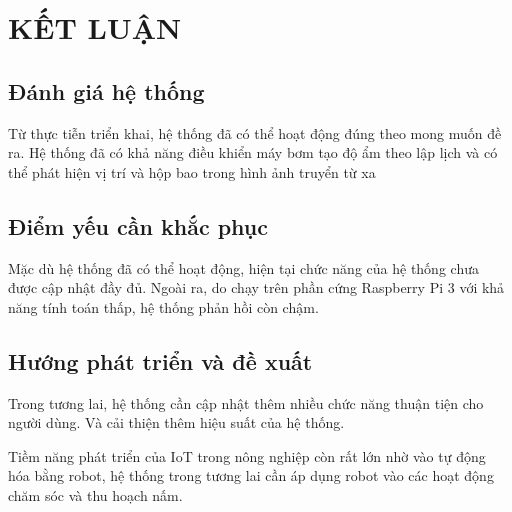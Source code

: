 \chapter{KẾT LUẬN}

\section{Đánh giá hệ thống}

Từ thực tiễn triển khai, hệ thống đã có thể hoạt động đúng theo mong muốn đề ra. Hệ thống đã có khả năng điều khiển máy bơm tạo độ ẩm theo lập lịch và có thể phát hiện vị trí và hộp bao trong hình ảnh truyển từ xa

\section{Điểm yếu cần khắc phục}

Mặc dù hệ thống đã có thể hoạt động, hiện tại chức năng của hệ thống chưa được cập nhật đầy đủ. Ngoài ra, do chạy trên phần cứng Raspberry Pi 3 với khả năng tính toán thấp, hệ thống phản hồi còn chậm.

\section{Hướng phát triển và đề xuất}

Trong tương lai, hệ thống cần cập nhật thêm nhiều chức năng thuận tiện cho người dùng. Và cải thiện thêm hiệu suất của hệ thống.

Tiềm năng phát triển của IoT trong nông nghiệp còn rất lớn nhờ vào tự động hóa bằng robot, hệ thống trong tương lai cần áp dụng robot vào các hoạt động chăm sóc và thu hoạch nấm.